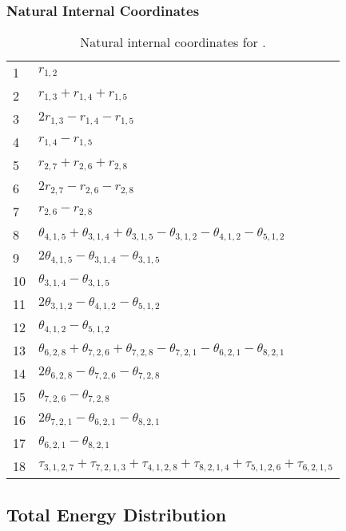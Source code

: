 \documentclass[10pt,oneside]{article}
\begin{document}
\begin{table}[h!]
\subsubsection*{Natural Internal Coordinates}
\centering
\caption{Natural internal coordinates for .}
\small
\begin{tabular}{ll}
\toprule
  1   & $r_{1,2}$ \\
  2   & $r_{1,3} + r_{1,4} + r_{1,5}$ \\
  3   & $2r_{1,3} - r_{1,4} - r_{1,5}$ \\
  4   & $r_{1,4} - r_{1,5}$ \\
  5   & $r_{2,7} + r_{2,6} + r_{2,8}$ \\
  6   & $2r_{2,7} - r_{2,6} - r_{2,8}$ \\
  7   & $r_{2,6} - r_{2,8}$ \\
  8   & $\theta_{4,1,5} + \theta_{3,1,4} + \theta_{3,1,5} - \theta_{3,1,2} - \theta_{4,1,2} - \theta_{5,1,2}$ \\
  9   & $2\theta_{4,1,5} - \theta_{3,1,4} - \theta_{3,1,5}$ \\
  10  & $\theta_{3,1,4} - \theta_{3,1,5}$ \\
  11  & $2\theta_{3,1,2} - \theta_{4,1,2} - \theta_{5,1,2}$ \\
  12  & $\theta_{4,1,2} - \theta_{5,1,2}$ \\
  13  & $\theta_{6,2,8} + \theta_{7,2,6} + \theta_{7,2,8} - \theta_{7,2,1} - \theta_{6,2,1} - \theta_{8,2,1}$ \\
  14  & $2\theta_{6,2,8} - \theta_{7,2,6} - \theta_{7,2,8}$ \\
  15  & $\theta_{7,2,6} - \theta_{7,2,8}$ \\
  16  & $2\theta_{7,2,1} - \theta_{6,2,1} - \theta_{8,2,1}$ \\
  17  & $\theta_{6,2,1} - \theta_{8,2,1}$ \\
  18  & $\tau_{3,1,2,7} + \tau_{7,2,1,3} + \tau_{4,1,2,8} + \tau_{8,2,1,4} + \tau_{5,1,2,6} + \tau_{6,2,1,5}$ \\
\bottomrule
\end{tabular}
\end{table}

\begin{table}
\subsection*{Total Energy Distribution}
\centering\end{table}
\end{document}
